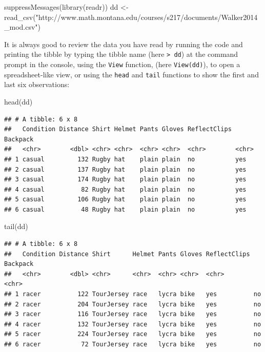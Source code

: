 \documentclass[
]{book}
\newenvironment{Shaded}{\begin{snugshade}}{\end{snugshade}}
\newcommand{\FunctionTok}[1]{\textcolor[rgb]{0.00,0.00,0.00}{#1}}
\newcommand{\NormalTok}[1]{#1}
\newcommand{\OtherTok}[1]{\textcolor[rgb]{0.56,0.35,0.01}{#1}}
\newcommand{\StringTok}[1]{\textcolor[rgb]{0.31,0.60,0.02}{#1}}
\begin{document}
\begin{Shaded}
\begin{Highlighting}[]
\FunctionTok{suppressMessages}\NormalTok{(}\FunctionTok{library}\NormalTok{(readr))}
\NormalTok{dd }\OtherTok{\textless{}{-}} \FunctionTok{read\_csv}\NormalTok{(}\StringTok{"http://www.math.montana.edu/courses/s217/documents/Walker2014\_mod.csv"}\NormalTok{)}
\end{Highlighting}
\end{Shaded}

It is always good to review the data you have read by running the code and printing the tibble  by typing the tibble name (here \texttt{\textgreater{}\ dd}) at the command prompt in the console, using the \texttt{View} function, (here \texttt{View(dd)}), to open a spreadsheet-like view, or using the \texttt{head} and \texttt{tail} functions to show the first and last six observations:

\newpage

\begin{Shaded}
\begin{Highlighting}[]
\FunctionTok{head}\NormalTok{(dd)}
\end{Highlighting}
\end{Shaded}

\begin{verbatim}
## # A tibble: 6 x 8
##   Condition Distance Shirt Helmet Pants Gloves ReflectClips Backpack
##   <chr>        <dbl> <chr> <chr>  <chr> <chr>  <chr>        <chr>   
## 1 casual         132 Rugby hat    plain plain  no           yes     
## 2 casual         137 Rugby hat    plain plain  no           yes     
## 3 casual         174 Rugby hat    plain plain  no           yes     
## 4 casual          82 Rugby hat    plain plain  no           yes     
## 5 casual         106 Rugby hat    plain plain  no           yes     
## 6 casual          48 Rugby hat    plain plain  no           yes
\end{verbatim}

\begin{Shaded}
\begin{Highlighting}[]
\FunctionTok{tail}\NormalTok{(dd)}
\end{Highlighting}
\end{Shaded}

\begin{verbatim}
## # A tibble: 6 x 8
##   Condition Distance Shirt      Helmet Pants Gloves ReflectClips Backpack
##   <chr>        <dbl> <chr>      <chr>  <chr> <chr>  <chr>        <chr>   
## 1 racer          122 TourJersey race   lycra bike   yes          no      
## 2 racer          204 TourJersey race   lycra bike   yes          no      
## 3 racer          116 TourJersey race   lycra bike   yes          no      
## 4 racer          132 TourJersey race   lycra bike   yes          no      
## 5 racer          224 TourJersey race   lycra bike   yes          no      
## 6 racer           72 TourJersey race   lycra bike   yes          no
\end{verbatim}
\end{document}
